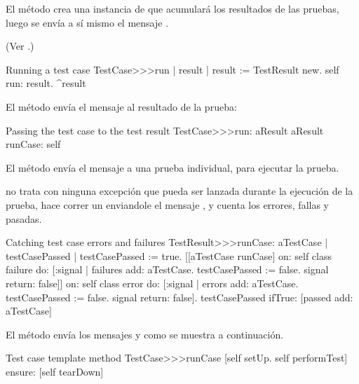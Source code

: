 \documentclass[a4paper,10pt,twoside]{book}
\begin{document}
El m\'etodo  crea una instancia de 
 que acumular\'a los resultados de las pruebas, luego se env\'ia a s\'i mismo el mensaje  .

(Ver .)

\begin{method}[tastecaserun]{Running a test case}
TestCase>>>run
	| result |
	result := TestResult new.
	self run: result.
	^result
\end{method}


El m\'etodo 
 env\'ia el mensaje
 al resultado de la prueba:

\begin{method}[testcaserun:]{Passing the test case to the test result}
TestCase>>>run: aResult
	aResult runCase: self
\end{method}

El m\'etodo  env\'ia
el mensaje  a una prueba individual, para ejecutar la prueba.

 no trata con ninguna excepci\'on que pueda ser
lanzada durante la ejecuci\'on de la prueba, hace correr un enviandole el mensaje
, y cuenta los errores, fallas y pasadas.

\begin{method}[testresultruncase]{Catching test case errors and failures}
TestResult>>>runCase: aTestCase
	| testCasePassed |
	testCasePassed := true.
	[[aTestCase runCase] 
			on: self class failure
			do: 
				[:signal | 
				failures add: aTestCase.
				testCasePassed := false.
				signal return: false]]
					on: self class error
					do:
						[:signal |
						errors add: aTestCase.
						testCasePassed := false.
						signal return: false].
	testCasePassed ifTrue: [passed add: aTestCase]
\end{method}

El m\'etodo   env\'ia  los mensajes  y 
como se muestra a continuaci\'on. 

\begin{method}[testcaseruncase]{Test case template method}
TestCase>>>runCase
	[self setUp.
	self performTest] ensure: [self tearDown]
\end{method}
\end{document}
